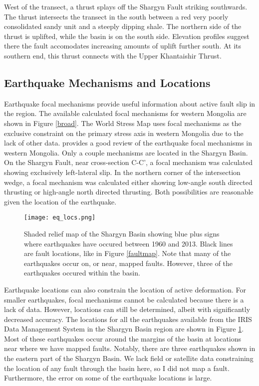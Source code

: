 West of the transect, a thrust splays off the Shargyn Fault striking southwards. The thrust intersects the transect in the south between a red very poorly consolidated sandy unit and a steeply dipping shale. The northern side of the thrust is uplifted, while the basin is on the south side. Elevation profiles suggest there the fault accomodates increasing amounts of uplift further south. At its southern end, this thrust connects with the Upper Khantaishir Thrust. 

\subsection{Earthquake Mechanisms and Locations}
	Earthquake focal mechanisms provide useful information about active fault slip in the region. The available calculated focal mechanisms for western Mongolia are shown in Figure \ref{broad}. The World Stress Map \citep{WorldStressMap2008} uses focal mechanisms as the exclusive constraint on the primary stress axis in western Mongolia due to the lack of other data. \citet{Bayasgalan2005a} provides a good review of the earthquake focal mechanisms in western Mongolia. Only a couple mechanisms are located in the Shargyn Basin. On the Shargyn Fault, near cross-section C-C', a focal mechanism was calculated showing exclusively left-lateral slip. In the northern corner of the intersection wedge, a focal mechanism was calculated either showing low-angle south directed thrusting or high-angle north directed thrusting. Both possibilities are reasonable given the location of the earthquake.  

\begin{figure}[h!]
  \centering
  \texttt{[image: eq\_locs.png]}
  \caption{Shaded relief map of the Shargyn Basin showing blue plus signs where earthquakes have occured between 1960 and 2013. Black lines are fault locations, like in Figure \ref{faultmap}. Note that many of the earthquakes occur on, or near, mapped faults. However, three of the earthquakes occured within the basin.}
  \label{eqlocs}
\end{figure}	

	Earthquake locations can also constrain the location of active deformation. For smaller earthquakes, focal mechanisms cannot be calculated because there is a lack of data. However, locations can still be determined, albeit with significantly decreased accuracy. The locations for all the earthquakes available from the IRIS Data Management System in the Shargyn Basin region are shown in Figure \ref{eqlocs}. Most of these earthquakes occur around the margins of the basin at locations near where we have mapped faults. Notably, there are three earthquakes shown in the eastern part of the Shargyn Basin. We lack field or satellite data constraining the location of any fault through the basin here, so I did not map a fault. Furthermore, the error on some of the earthquake locations is large.


